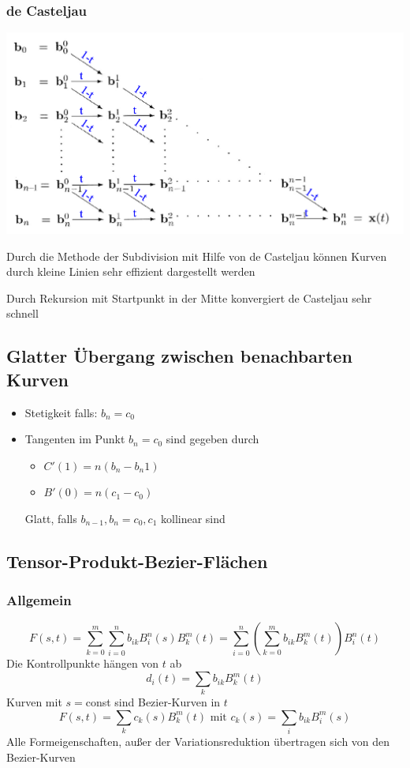 \subsubsection{de Casteljau}
\begin{center}
	\includegraphics[scale=0.5]{images/de_Casteljau.png}
\end{center}
Durch die Methode der Subdivision mit Hilfe von de Casteljau können Kurven durch kleine Linien sehr effizient dargestellt werden

Durch Rekursion mit Startpunkt in der Mitte konvergiert de Casteljau sehr schnell
\subsection{Glatter Übergang zwischen benachbarten Kurven}
\begin{itemize}
	\item Stetigkeit falls: $b_n = c_0$
	\item Tangenten im Punkt $b_n = c_0$ sind gegeben durch
		\begin{itemize}
			\item $C'(1)=n(b_n-b_n1)$
			\item $B'(0)=n(c_1-c_0)$
		\end{itemize}
	
	Glatt, falls $b_{n-1}, b_n = c_0, c_1$ kollinear sind

\end{itemize}
\subsection{Tensor-Produkt-Bezier-Flächen}
\subsubsection{Allgemein}
$$
	F(s,t) = \sum_{k=0}^m \sum_{i=0}^n b_{ik} B_i^n(s)B_k^m(t)=\sum_{i=0}^n(\sum_{k=0}^m b_{ik} B_k^m(t))B_i^n(t)
$$
Die Kontrollpunkte hängen von $t$ ab
$$
	d_i(t) = \sum_k b_{ik} B_k^m (t)
$$
Kurven mit $s=$const sind Bezier-Kurven in $t$
$$
	F(s,t)=\sum_k c_k(s) B_k^m(t) \text{ mit } c_k(s) = \sum_i b_{ik} B_i^m (s)
$$
Alle Formeigenschaften, außer der Variationsreduktion übertragen sich von den Bezier-Kurven
